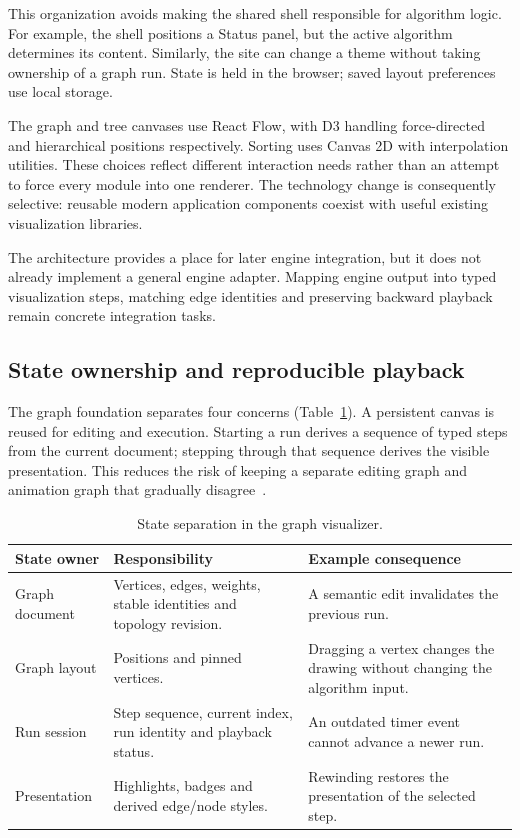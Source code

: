 \documentclass[11pt,a4paper]{article}
\newcommand{\page}{\par\vspace{8pt}}
\begin{document}
This organization avoids making the shared shell responsible for algorithm logic. For example, the shell positions a Status panel, but the active algorithm determines its content. Similarly, the site can change a theme without taking ownership of a graph run. State is held in the browser; saved layout preferences use local storage.

The graph and tree canvases use React Flow, with D3 handling force-directed and hierarchical positions respectively. Sorting uses Canvas 2D with interpolation utilities. These choices reflect different interaction needs rather than an attempt to force every module into one renderer. The technology change is consequently selective: reusable modern application components coexist with useful existing visualization libraries.

The architecture provides a place for later engine integration, but it does not already implement a general engine adapter. Mapping engine output into typed visualization steps, matching edge identities and preserving backward playback remain concrete integration tasks.

\page
\subsection{State ownership and reproducible playback}\label{sec:state}
The graph foundation separates four concerns (Table~\ref{tab:state}). A persistent canvas is reused for editing and execution. Starting a run derives a sequence of typed steps from the current document; stepping through that sequence derives the visible presentation. This reduces the risk of keeping a separate editing graph and animation graph that gradually disagree~\cite{architecture}.

\begin{table}[tbp]\small\centering
\caption{State separation in the graph visualizer.}\label{tab:state}
\begin{tabularx}{\linewidth}{@{}p{31mm}X X@{}}\toprule
State owner & Responsibility & Example consequence\\\midrule
Graph document & Vertices, edges, weights, stable identities and topology revision. & A semantic edit invalidates the previous run.\\
Graph layout & Positions and pinned vertices. & Dragging a vertex changes the drawing without changing the algorithm input.\\
Run session & Step sequence, current index, run identity and playback status. & An outdated timer event cannot advance a newer run.\\
Presentation & Highlights, badges and derived edge/node styles. & Rewinding restores the presentation of the selected step.\\\bottomrule
\end{tabularx}
\end{table}
\end{document}
